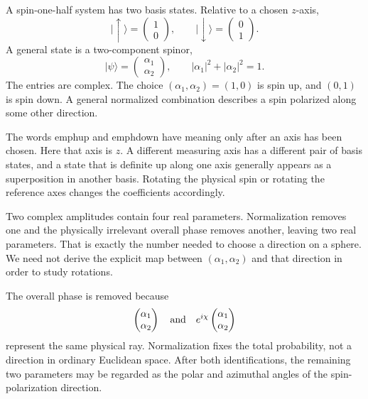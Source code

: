 A spin-one-half system has two basis states. Relative to a chosen \(z\)-axis,
\begin{equation}
\lvert\uparrow\rangle=
\begin{pmatrix}1\\0\end{pmatrix},
\qquad
\lvert\downarrow\rangle=
\begin{pmatrix}0\\1\end{pmatrix}.
\end{equation}
A general state is a two-component spinor,
\begin{equation}
\lvert\psi\rangle=
\begin{pmatrix}\alpha_1\\\alpha_2\end{pmatrix},
\qquad
|\alpha_1|^2+|\alpha_2|^2=1.
\label{eq:l3-spinor}
\end{equation}
The entries are complex. The choice \((\alpha_1,\alpha_2)=(1,0)\) is spin up,
and \((0,1)\) is spin down. A general normalized combination describes a spin
polarized along some other direction.

The words emph{up} and emph{down} have meaning only after an axis has been
chosen. Here that axis is \(z\). A different measuring axis has a different
pair of basis states, and a state that is definite up along one axis generally
appears as a superposition in another basis. Rotating the physical spin or
rotating the reference axes changes the coefficients accordingly.

Two complex amplitudes contain four real parameters. Normalization removes one
and the physically irrelevant overall phase removes another, leaving two real
parameters. That is exactly the number needed to choose a direction on a
sphere. We need not derive the explicit map between
\((\alpha_1,\alpha_2)\) and that direction in order to study rotations.

The overall phase is removed because
\begin{equation}
\begin{pmatrix}\alpha_1\\\alpha_2\end{pmatrix}
\quad\hbox{and}\quad
e^{i\chi}
\begin{pmatrix}\alpha_1\\\alpha_2\end{pmatrix}
\end{equation}
represent the same physical ray. Normalization fixes the total probability,
not a direction in ordinary Euclidean space. After both identifications, the
remaining two parameters may be regarded as the polar and azimuthal angles of
the spin-polarization direction.

